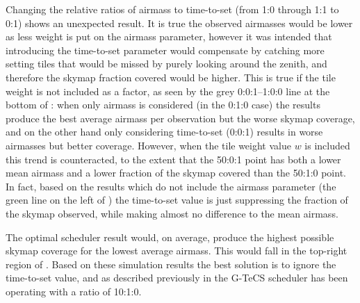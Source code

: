 \begin{colsection}
Changing the relative ratios of airmass to time-to-set (from 1:0 through 1:1 to 0:1) shows an unexpected result. It is true the observed airmasses would be lower as less weight is put on the airmass parameter, however it was intended that introducing the time-to-set parameter would compensate by catching more setting tiles that would be missed by purely looking around the zenith, and therefore the skymap fraction covered would be higher. This is true if the tile weight is not included as a factor, as seen by the grey 0:0:1--1:0:0 line at the bottom of : when only airmass is considered (in the 0:1:0 case) the results produce the best average airmass per observation but the worse skymap coverage, and on the other hand only considering time-to-set (0:0:1) results in worse airmasses but better coverage. However, when the tile weight value $w$ is included this trend is counteracted, to the extent that the 50:0:1 point has both a lower mean airmass and a lower fraction of the skymap covered than the 50:1:0 point. In fact, based on the results which do not include the airmass parameter (the green line on the left of ) the time-to-set value is just suppressing the fraction of the skymap observed, while making almost no difference to the mean airmass.

The optimal scheduler result would, on average, produce the highest possible skymap coverage for the lowest average airmass. This would fall in the top-right region of . Based on these simulation results the best solution is to ignore the time-to-set value, and as described previously in  the G-TeCS scheduler has been operating with a ratio of 10:1:0.

\end{colsection}


